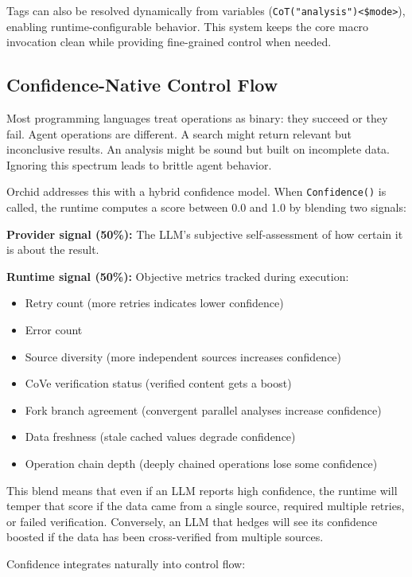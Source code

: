 \documentclass[11pt,a4paper]{article}
\begin{document}
Tags can also be resolved dynamically from variables (\texttt{CoT("analysis")<\$mode>}), enabling runtime-configurable behavior. This system keeps the core macro invocation clean while providing fine-grained control when needed.

\subsection{Confidence-Native Control Flow}

Most programming languages treat operations as binary: they succeed or they fail. Agent operations are different. A search might return relevant but inconclusive results. An analysis might be sound but built on incomplete data. Ignoring this spectrum leads to brittle agent behavior.

Orchid addresses this with a hybrid confidence model. When \texttt{Confidence()} is called, the runtime computes a score between 0.0 and 1.0 by blending two signals:

\textbf{Provider signal (50\%):} The LLM's subjective self-assessment of how certain it is about the result.

\textbf{Runtime signal (50\%):} Objective metrics tracked during execution:
\begin{itemize}[leftmargin=*,nosep]
  \item Retry count (more retries indicates lower confidence)
  \item Error count
  \item Source diversity (more independent sources increases confidence)
  \item CoVe verification status (verified content gets a boost)
  \item Fork branch agreement (convergent parallel analyses increase confidence)
  \item Data freshness (stale cached values degrade confidence)
  \item Operation chain depth (deeply chained operations lose some confidence)
\end{itemize}

This blend means that even if an LLM reports high confidence, the runtime will temper that score if the data came from a single source, required multiple retries, or failed verification. Conversely, an LLM that hedges will see its confidence boosted if the data has been cross-verified from multiple sources.

Confidence integrates naturally into control flow:
\end{document}
